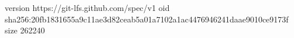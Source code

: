 version https://git-lfs.github.com/spec/v1
oid sha256:20fb1831655a9c11ae3d82ceab5a01a7102a1ac4476946241daae9010ce9173f
size 262240

